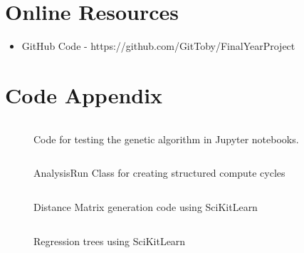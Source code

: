 \begin{appendices}
    \chapter{Online Resources}\label{apndx:resources}
    \begin{itemize}
        \item GitHub Code - https://github.com/GitToby/FinalYearProject
    \end{itemize}
    \chapter{Code Appendix}\label{apndx:code}
    \begin{figure}[ht]
        \inputminted[fontsize=\small]{python}{./code_snippets/appendix/runGeneticAlgo.py}
        \caption{Code for testing the genetic algorithm in Jupyter notebooks.}\label{apcode:runGeneticAlgo.py}
    \end{figure}

    \begin{figure}[ht]
        \inputminted[fontsize=\small]{python}{./code_snippets/appendix/AnalysisRun.py}
        \caption{AnalysisRun Class for creating structured compute cycles}\label{apcode:AnalysisRun.py}
    \end{figure}

    \begin{figure}[ht]
        \inputminted[fontsize=\small]{python}{./code_snippets/appendix/dist_matrix.py}
        \caption{Distance Matrix generation code using SciKitLearn}\label{apcode:dist_matrix.py}
    \end{figure}

    \begin{figure}[ht]
        \inputminted[fontsize=\small]{python}{./code_snippets/appendix/reg_tree.py}
        \caption{Regression trees using SciKitLearn}\label{apcode:reg_tree.py}
    \end{figure}


\end{appendices}
